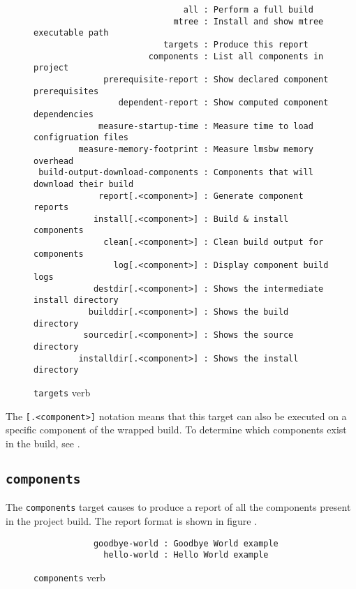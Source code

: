 \begin{figure}[tbh]
\hrulefill
\begin{footnotesize}
\begin{verbatim}
                              all : Perform a full build
                            mtree : Install and show mtree executable path
                          targets : Produce this report
                       components : List all components in project
              prerequisite-report : Show declared component prerequisites
                 dependent-report : Show computed component dependencies
             measure-startup-time : Measure time to load configruation files
         measure-memory-footprint : Measure lmsbw memory overhead
 build-output-download-components : Components that will download their build
             report[.<component>] : Generate component reports
            install[.<component>] : Build & install components
              clean[.<component>] : Clean build output for components
                log[.<component>] : Display component build logs
            destdir[.<component>] : Shows the intermediate install directory
           builddir[.<component>] : Shows the build directory
          sourcedir[.<component>] : Shows the source directory
         installdir[.<component>] : Shows the install directory
\end{verbatim}
\end{footnotesize}
\hrulefill
\caption{\texttt{targets} verb}\label{usinglmsbw:targets-verb}
\end{figure}

The \texttt{[.<component>]} notation means that this target can also
be executed on a specific component of the wrapped build.  To
determine which components exist in the build, see
.

\subsection{\texttt{components}}\label{usinglmsbw:target:components}

The \texttt{components} target causes \lmsbw to produce a report of all
the components present in the project build.  The report format is
shown in figure .

\begin{figure}[tbh]
\hrulefill
\begin{verbatim}
            goodbye-world : Goodbye World example
              hello-world : Hello World example
\end{verbatim}
\hrulefill
\caption{\texttt{components} verb}\label{usinglmsbw:components-verb}
\end{figure}

